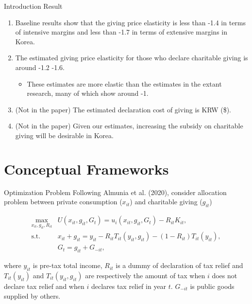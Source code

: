 \documentclass[
  ignorenonframetext,
  aspectratio=169,
]{beamer}
\providecommand{\tightlist}{%
  \setlength{\itemsep}{0pt}\setlength{\parskip}{0pt}}
\begin{document}
\begin{frame}{Introduction}
\protect\hypertarget{introduction-2}{}
Result

\begin{enumerate}
\tightlist
\item
  Baseline results show that the giving price elasticity is less than -1.4 in terms of intensive margins and less than -1.7 in terms of extensive margins in Korea.
\item
  The estimated giving price elasticity for those who declare charitable giving is around -1.2 -1.6.

  \begin{itemize}
  \tightlist
  \item
    These estimates are more elastic than the estimates in the extant research, many of which show around -1.
  \end{itemize}
\item
  (Not in the paper) The estimated declaration cost of giving is KRW (\$).
\item
  (Not in the paper) Given our estimates, increasing the subsidy on charitable giving will be desirable in Korea.
\end{enumerate}
\end{frame}

\hypertarget{conceptual-frameworks}{%
\section{Conceptual Frameworks}\label{conceptual-frameworks}}

\begin{frame}{Optimization Problem}
\protect\hypertarget{optimization-problem}{}
Following Almunia et al. (2020),
consider allocation problem between private consumption (\(x_{it}\)) and charitable giving (\(g_{it}\))

\begin{align}
  \max_{x_{it}, g_{it}, R_{it}} &U(x_{it}, g_{it}, G_t)
  = u_i(x_{it}, g_{it}, G_t) - R_{it}K_{it}, \\
  \text{s.t.}\:\:
  &x_{it} + g_{it}
  = y_{it} - R_{it} T_{it}(y_{it}, g_{it}) - (1 - R_{it}) T_{it}(y_{it}), \\
  &G_t = g_{it} + G_{-it},
\end{align}

where \(y_{it}\) is pre-tax total income, \(R_{it}\) is a dummy of declaration of tax relief and \(T_{it}(y_{it})\) and \(T_{it}(y_{it}, g_{it})\) are respectively the amount of tax when \(i\) does not declare tax relief and when \(i\) declares tax relief in year \(t\). \(G_{-it}\) is public goods supplied by others.
\end{frame}
\end{document}
